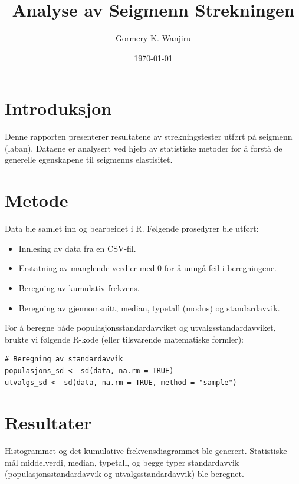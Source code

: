 \documentclass{article}
\begin{document}
\title{Analyse av Seigmenn Strekningen}
\author{Gormery K. Wanjiru}
\date{\today}
\maketitle

\section{Introduksjon}
Denne rapporten presenterer resultatene av strekningstester utført på seigmenn (laban). Dataene er analysert ved hjelp av statistiske metoder for å forstå de generelle egenskapene til seigmenns elastisitet.

\section{Metode}
Data ble samlet inn og bearbeidet i R. Følgende prosedyrer ble utført:
\begin{itemize}
    \item Innlesing av data fra en CSV-fil.
    \item Erstatning av manglende verdier med 0 for å unngå feil i beregningene.
    \item Beregning av kumulativ frekvens.
    \item Beregning av gjennomsnitt, median, typetall (modus) og standardavvik.
\end{itemize}

For å beregne både populasjonsstandardavviket og utvalgsstandardavviket, brukte vi følgende R-kode (eller tilsvarende matematiske formler):
\begin{verbatim}
# Beregning av standardavvik
populasjons_sd <- sd(data, na.rm = TRUE)
utvalgs_sd <- sd(data, na.rm = TRUE, method = "sample")
\end{verbatim}

\section{Resultater}
Histogrammet og det kumulative frekvensdiagrammet ble generert. Statistiske mål middelverdi, median, typetall, og begge typer standardavvik (populasjonsstandardavvik og utvalgsstandardavvik) ble beregnet.
\end{document}
